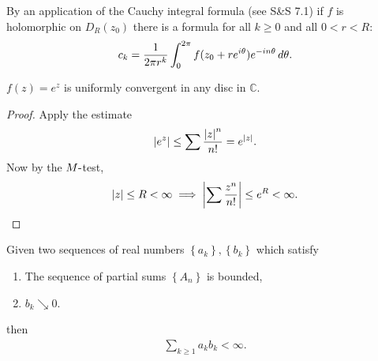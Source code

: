 \begin{remark}

By an application of the Cauchy integral formula (see S\&S 7.1) if \(f\)
is holomorphic on \(D_R(z_0)\) there is a formula for all \(k\geq 0\)
and all \(0<r<R\):
\begin{align*}
c_k = {1\over 2\pi r^k} \int_0^{2\pi} f(z_0 + re^{i\theta}) e^{-in\theta}\,d\theta
.\end{align*}

\end{remark}

\begin{proposition}

\(f(z) = e^z\) is uniformly convergent in any disc in \({\mathbb{C}}\).

\end{proposition}

\begin{proof}

Apply the estimate
\begin{align*}  
{\left\lvert {e^z} \right\rvert} \leq \sum {{\left\lvert {z} \right\rvert}^n \over n!} = e^{{\left\lvert {z} \right\rvert}}
.\end{align*}
Now by the \(M{\hbox{-}}\)test,
\begin{align*}  
{\left\lvert {z} \right\rvert} \leq R < \infty \implies {\left\lvert {\sum {z^n \over n!}} \right\rvert} \leq e^R < \infty
.\end{align*}

\end{proof}

\begin{lemma}

Given two sequences of real numbers
\(\left\{{ a_k }\right\} , \left\{{ b_k }\right\}\) which satisfy

\begin{enumerate}
\def\labelenumi{\arabic{enumi}.}
\tightlist
\item
  The sequence of partial sums \(\left\{{ A_n }\right\}\) is bounded,
\item
  \(b_k \searrow 0\).
\end{enumerate}

then
\begin{align*}
\sum_{k\geq 1} a_k b_k < \infty
.\end{align*}

\end{lemma}

